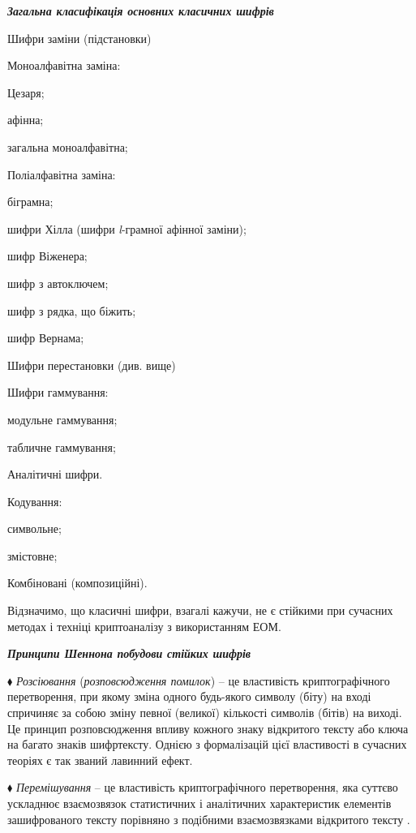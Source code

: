 \documentclass[a4paper]{article}
\newcounter{}
\begin{document}
\bigskip

{\centering\bfseries\itshape
Загальна класифікація основних класичних  шифрів
\par}


\bigskip

Шифри заміни (підстановки)

Моноалфавітна заміна:

Цезаря;

афінна;

загальна моноалфавітна;

Поліалфавітна заміна:

біграмна;

шифри Хілла (шифри \textit{l}{}-грамної афінної заміни);

шифр Віженера;

шифр з автоключем;

шифр з рядка, що біжить;

шифр Вернама;

Шифри перестановки (див. вище)

Шифри гаммування:

модульне гаммування;

табличне гаммування;


\bigskip

Аналітичні шифри.

Кодування:

символьне;

змістовне;

Комбіновані (композиційні).

Відзначимо,  що класичні  шифри, взагалі кажучи, не є стійкими при сучасних
методах і техніці криптоаналізу з використанням ЕОМ.


\bigskip

{\centering\bfseries\itshape
Принципи Шеннона побудови стійких  шифрів
\par}


\bigskip


\bigskip

${\blacklozenge}$ \textit{Розсіювання} (\textit{розповсюдження помилок}) – це
властивість криптографічного перетворення, при якому зміна одного будь-якого 
символу (біту) на вході спричиняє за собою зміну певної (великої)  кількості
символів (бітів) на виході. Це принцип розповсюдження впливу кожного знаку 
відкритого тексту або ключа на багато знаків шифртексту. Однією з формалізацій
цієї властивості  в сучасних теоріях є так званий лавинний ефект.

${\blacklozenge}$ \textit{Перемішування }– це властивість криптографічного
перетворення, яка суттєво ускладнює взаємозв{\textquotesingle}язок статистичних
 і аналітичних характеристик елементів зашифрованого тексту порівняно з
подібними взаємозв{\textquotesingle}язками відкритого тексту . 
\end{document}
